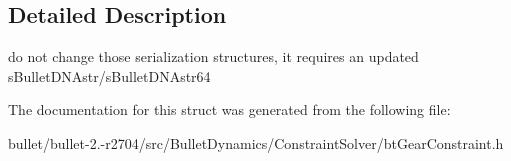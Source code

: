 \subsection{Detailed Description}
do not change those serialization structures, it requires an updated s\+Bullet\+D\+N\+Astr/s\+Bullet\+D\+N\+Astr64 

The documentation for this struct was generated from the following file\+:\begin{DoxyCompactItemize}
\item 
bullet/bullet-\/2.-\/r2704/src/\+Bullet\+Dynamics/\+Constraint\+Solver/bt\+Gear\+Constraint.\+h\end{DoxyCompactItemize}
